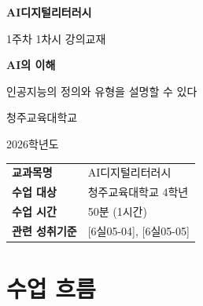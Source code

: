 \documentclass[11pt,a4paper]{article}
\begin{document}
\begin{titlepage}
\centering
\vspace*{3cm}

{\Huge\bfseries\color{primary} AI디지털리터러시}

\vspace{0.5cm}

{\LARGE\color{darkblue} 1주차 1차시 강의교재}

\vspace{1.5cm}

{\Huge\bfseries AI의 이해}

\vspace{0.5cm}

{\Large\color{darkgray} 인공지능의 정의와 유형을 설명할 수 있다}

\vspace{3cm}

{\large 청주교육대학교}

\vspace{0.3cm}

{\large 2026학년도}

\vspace{2cm}

\begin{tcolorbox}[colback=lightblue, colframe=primary, width=0.8\textwidth, halign=center]
\begin{tabular}{ll}
\textbf{교과목명} & AI디지털리터러시 \\
\textbf{수업 대상} & 청주교육대학교 4학년 \\
\textbf{수업 시간} & 50분 (1시간) \\
\textbf{관련 성취기준} & {[6실05-04]}, {[6실05-05]} \\
\end{tabular}
\end{tcolorbox}

\end{titlepage}

\tableofcontents
\newpage

\section*{ 수업 흐름}
\end{document}
